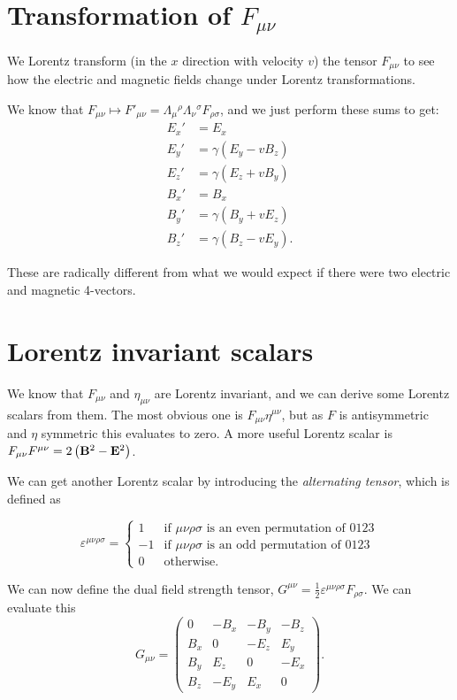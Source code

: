 \documentclass{notes}
\newcommand{\B}{\vect{B}}
\newcommand{\E}{\vect{E}}
\begin{document}
\section{Transformation of $F_{\mu \nu}$}

We Lorentz transform (in the $x$ direction with velocity $v$) the
tensor $F_{\mu \nu}$ to see how the electric and magnetic fields
change under Lorentz transformations.

We know that $F_{\mu \nu} \mapsto F'_{\mu \nu}
= \Lambda_\mu{}^\rho \Lambda_\nu{}^\sigma F_{\rho \sigma}$, and
we just perform these sums to get:
\begin{align*}
E_x' &= E_x \\
E_y' &= \gamma ( E_y - v B_z ) \\
E_z' &= \gamma ( E_z + v B_y ) \\
B_x' &= B_x \\
B_y' &= \gamma (B_y + v E_z) \\
B_z' &= \gamma (B_z - v E_y).
\end{align*}

These are radically different from what we would expect if there were two
electric and magnetic 4-vectors.

\section{Lorentz invariant scalars}

We know that $F_{\mu \nu}$ and $\eta_{\mu \nu}$ are Lorentz invariant, and
we can derive some Lorentz scalars from them.  The most obvious one
is $F_{\mu \nu} \eta^{\mu \nu}$, but as $F$ is antisymmetric and $\eta$
symmetric this evaluates to zero.  A more useful Lorentz scalar
is $F_{\mu \nu} F^{\mu \nu} = 2 \left(\B^2 -\E^2 \right)$.

We can get another Lorentz scalar by introducing the \emph{alternating
tensor}, which is defined as

\[
\varepsilon^{\mu \nu \rho \sigma}
= \begin{cases} 1 & \text{if $\mu \nu \rho \sigma$ is an even permutation
of $0 1 2 3$} \\
-1 & \text{if $\mu \nu \rho \sigma$ is an odd permutation of $0 1 2 3$} \\
0 & \text{otherwise.}
 \end{cases}
\]

We can now define the dual field strength tensor, $G^{\mu \nu}
= \frac{1}{2} \varepsilon^{\mu \nu \rho \sigma} F_{\rho \sigma}$.  We
can evaluate this
\[
G_{\mu \nu} =
\begin{pmatrix}
0 & -B_x & - B_y & -B_z \\
B_x & 0 & -E_z & E_y \\
B_y & E_z & 0 & -E_x \\
B_z & -E_y & E_x & 0
\end{pmatrix}.
\]
\end{document}
